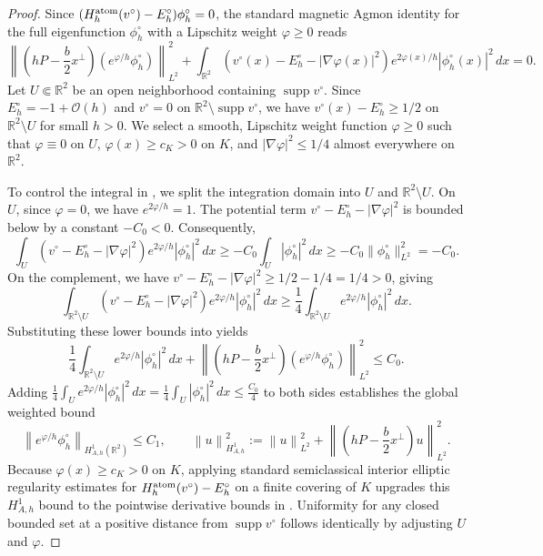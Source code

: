 \documentclass[11pt]{article}
\newcommand{\R}{\mathbb R}
\newcommand{\cO}{\mathcal O}
\newcommand{\norm}[1]{\left\|#1\right\|}
\newcommand{\supp}{\operatorname{supp}}
\begin{document}
\begin{proof}
Since $(H_h^{\rm atom}(v^\circ) - E_h^\circ)\phi_h^\circ = 0$, the standard magnetic Agmon identity for the full eigenfunction $\phi_h^\circ$ with a Lipschitz weight $\varphi \ge 0$ reads
\begin{equation}\label{eq:agmon-identity}
 \norm{\left(hP-\frac b2x^\perp\right)(e^{\varphi/h}\phi_h^\circ)}_{L^2}^2 
 + \int_{\R^2} \left(v^\circ(x) - E_h^\circ - |\nabla\varphi(x)|^2\right) e^{2\varphi(x)/h}|\phi_h^\circ(x)|^2 \, dx = 0.
\end{equation}
Let $U \Subset \R^2$ be an open neighborhood containing $\supp v^\circ$. Since $E_h^\circ = -1 + \cO(h)$ and $v^\circ = 0$ on $\R^2 \setminus \supp v^\circ$, we have $v^\circ(x) - E_h^\circ \ge 1/2$ on $\R^2 \setminus U$ for small $h > 0$. We select a smooth, Lipschitz weight function $\varphi \ge 0$ such that $\varphi \equiv 0$ on $U$, $\varphi(x) \ge c_K > 0$ on $K$, and $|\nabla\varphi|^2 \le 1/4$ almost everywhere on $\R^2$.

To control the integral in , we split the integration domain into $U$ and $\R^2 \setminus U$.
On $U$, since $\varphi = 0$, we have $e^{2\varphi/h} = 1$. The potential term $v^\circ - E_h^\circ - |\nabla\varphi|^2$ is bounded below by a constant $-C_0 < 0$. Consequently,
 \[
   \int_U \left(v^\circ - E_h^\circ - |\nabla\varphi|^2\right) e^{2\varphi/h}|\phi_h^\circ|^2 \, dx 
   \ge -C_0 \int_U |\phi_h^\circ|^2 \, dx 
   \ge -C_0 \|\phi_h^\circ\|_{L^2}^2 = -C_0.
 \]
On the complement, we have $v^\circ - E_h^\circ - |\nabla\varphi|^2 \ge 1/2 - 1/4 = 1/4 > 0$, giving
 \[
   \int_{\R^2 \setminus U} \left(v^\circ - E_h^\circ - |\nabla\varphi|^2\right) e^{2\varphi/h}|\phi_h^\circ|^2 \, dx 
   \ge \frac{1}{4} \int_{\R^2 \setminus U} e^{2\varphi/h}|\phi_h^\circ|^2 \, dx.
 \]
Substituting these lower bounds into  yields
\[
 \frac{1}{4} \int_{\R^2 \setminus U} e^{2\varphi/h}|\phi_h^\circ|^2 \, dx + \norm{\left(hP-\frac b2x^\perp\right)(e^{\varphi/h}\phi_h^\circ)}_{L^2}^2 
 \le C_0.
\]
Adding $\frac{1}{4}\int_U e^{2\varphi/h}|\phi_h^\circ|^2 \, dx = \frac{1}{4}\int_U |\phi_h^\circ|^2 \, dx \le \frac{C_0}{4}$ to both sides establishes the global weighted bound
\[
 \norm{e^{\varphi/h}\phi_h^\circ}_{H^1_{A,h}(\R^2)} \le C_1,
 \qquad
 \norm{u}_{H^1_{A,h}}^2
 :=\norm{u}_{L^2}^2+\norm{\left(hP-\frac b2x^\perp\right)u}_{L^2}^2.
\]
Because $\varphi(x) \ge c_K > 0$ on $K$, applying standard semiclassical interior elliptic regularity estimates for $H_h^{\rm atom}(v^\circ) - E_h^\circ$ on a finite covering of $K$ upgrades this $H^1_{A,h}$ bound to the pointwise derivative bounds in . Uniformity for any closed bounded set at a positive distance from $\supp v^\circ$ follows identically by adjusting $U$ and $\varphi$.


\end{proof}
\end{document}
